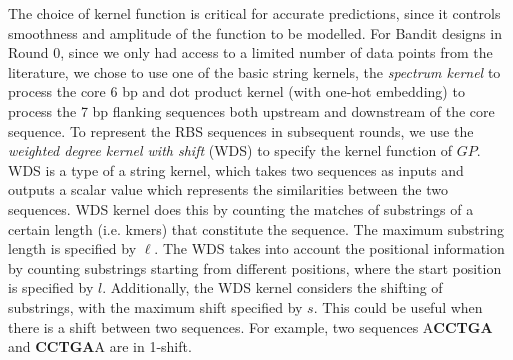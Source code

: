 The choice of kernel function is critical for accurate predictions, since it controls smoothness and amplitude of the function to be modelled.
For Bandit designs in Round 0, since we only had access to a limited number of data points from the literature, we chose to use one of the basic string kernels, the \textit{spectrum kernel} \cite{leslie2001spectrum} to process the core 6 bp and dot product kernel \cite{Rasmussen2004} (with one-hot embedding) to process the 7 bp flanking sequences both upstream and downstream of the core sequence.
To represent the RBS sequences in subsequent rounds, we use the \textit{weighted degree kernel with shift} (WDS) \cite{ratsch_rase_2005_wds,Ben-Hur2008} to specify the kernel function of $GP$.  
WDS is a type of a string kernel, which takes two sequences as inputs and outputs a scalar value which represents the similarities between the two sequences.  
WDS kernel does this by counting the matches of substrings of a certain length (i.e. kmers) that constitute the sequence.
The maximum substring length is specified by $\ell$.
The WDS takes into account the positional information by counting substrings starting from different positions, where the start position is specified by $l$.
Additionally, the WDS kernel considers the shifting of substrings, with the maximum shift specified by $s$.
This could be useful when there is a shift between two sequences.
For example, two sequences A\textbf{CCTGA} and \textbf{CCTGA}A are in 1-shift. \\

